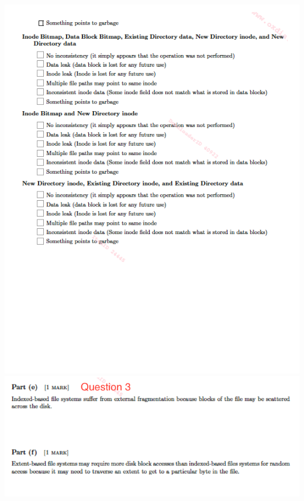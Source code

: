 \documentclass[12pt]{article}
\begin{document}
\begin{center}
\includegraphics[width=\linewidth]{../images/midterm_4_3.png}
\includegraphics[width=\linewidth]{../images/midterm_4_4.png}

\end{center}
\end{document}
